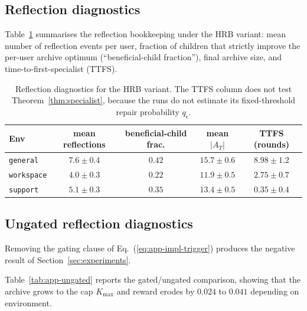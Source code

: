 \documentclass{article} %
\renewcommand{\eqref}[1]{\textup{(\ref{#1})}}
\begin{document}
\subsection{Reflection diagnostics}

\label{app:tab-refl}

Table~\ref{tab:app-reflection} summarises the reflection bookkeeping under the \textnormal{HRB} variant: mean number of reflection events per user, fraction of children that strictly improve the per-user archive optimum (``beneficial-child fraction''), final archive size, and time-to-first-specialist (TTFS).

\begin{table}[h]
\centering
\small
\begin{tabular}{lcccc}
\toprule
Env & mean reflections & beneficial-child frac. & mean $|A_T|$ & TTFS (rounds) \\
\midrule
\texttt{general}   & $7.6 \pm 0.4$ & $0.42$ & $15.7 \pm 0.6$ & $8.98 \pm 1.2$ \\
\texttt{workspace} & $4.0 \pm 0.3$ & $0.22$ & $11.9 \pm 0.5$ & $2.75 \pm 0.7$ \\
\texttt{support}   & $5.1 \pm 0.3$ & $0.35$ & $13.4 \pm 0.5$ & $0.35 \pm 0.4$ \\
\bottomrule
\end{tabular}
\caption{Reflection diagnostics for the \textnormal{HRB} variant. The TTFS column
does not test Theorem~\ref{thm:specialist}, because the runs do not estimate its
fixed-threshold repair probability \(q_\epsilon\).}
\label{tab:app-reflection}
\end{table}

\subsection{Ungated reflection diagnostics}

\label{app:tab-ungated}

Removing the gating clause of Eq.~\eqref{eq:app-impl-trigger} produces the
negative result of Section~\ref{sec:experiments}.

Table~\ref{tab:app-ungated} reports the gated/ungated comparison, showing that the archive grows to the cap $K_{\max}$ and reward erodes by $0.024$ to $0.041$ depending on environment.
\end{document}
